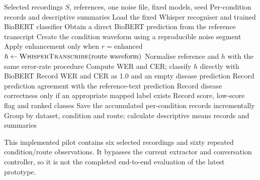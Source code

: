 \documentclass[11pt,a4paper]{article}
\begin{document}
\newpage
\begin{algorithm}[H]
\caption{Evaluate the legacy paired speech and noise experiment}
\label{alg:legacy-eval}
\begin{algorithmic}[1]
\Require Selected recordings $S$, references, one noise file, fixed models, seed
\Ensure Per-condition records and descriptive summaries
\State Load the fixed Whisper recogniser and trained BioBERT classifier
  \State Obtain a direct BioBERT prediction from the reference transcript
    \State Create the condition waveform using a reproducible noise segment
      \State Apply enhancement only when $r=\text{enhanced}$
      \State $h\gets\Call{WhisperTranscribe}{\text{route waveform}}$
      \State Normalise reference and $h$ with the same error-rate procedure
        \State Compute WER and CER; classify $h$ directly with BioBERT
      \Else
        \State Record WER and CER as 1.0 and an empty disease prediction
      \EndIf
      \State Record prediction agreement with the reference-text prediction
      \State Record disease correctness only if an appropriate mapped label exists
      \State Record score, low-score flag and ranked classes
      \State Save the accumulated per-condition records incrementally
    \EndFor
  \EndFor
\EndFor
\State Group by dataset, condition and route; calculate descriptive means
\State \Return records and summaries
\end{algorithmic}
\end{algorithm}
This implemented pilot contains six selected recordings and sixty repeated
condition/route observations. It bypasses the current extractor and conversation
controller, so it is not the completed end-to-end evaluation of the latest prototype.
\end{document}
